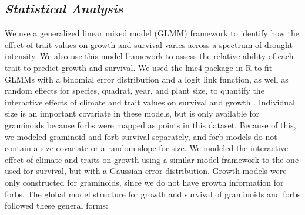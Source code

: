 \documentclass[12pt, letterpaper]{article}
\begin{document}
\subsection{\textit{Statistical Analysis}} We use a generalized linear mixed model (GLMM) framework to identify how the effect of trait values on growth and survival varies across a spectrum of drought intensity. We also use this model framework to assess the relative ability of each trait to predict growth and survival. We used the lme4 package in R to fit GLMMs with a binomial error distribution and a logit link function, as well as random effects for species, quadrat, year, and plant size, to quantify the interactive effects of climate and trait values on survival and growth \citep{RCoreTeam2019, Bates2015}. Individual size is an important covariate in these models, but is only available for graminoids because forbs were mapped as points in this dataset. Because of this, we modeled graminoid and forb survival separately, and forb models do not contain a size covariate or a random slope for size. We modeled the interactive effect of climate and traits on growth using a similar model framework to the one used for survival, but with a Gaussian error distribution. Growth models were only constructed for graminoids, since we do not have growth information for forbs. The global model structure for growth and survival of graminoids and forbs followed these general forms:
\end{document}

